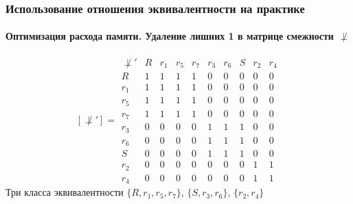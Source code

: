 \begin{frame}
    \frametitle{Использование отношения эквивалентности на практике}
    \framesubtitle{Оптимизация расхода памяти. Удаление лишних 1 в матрице смежности $\not\perp$}
    
    \[
        [\not\perp']=
        \begin{array}{c|ccccccccc}
            \not\perp'
                & R &r_1&r_5&r_7&r_3&r_6& S &r_2&r_4\\\hline
            R   & 1 & 1 & 1 & 1 & 0 & 0 & 0 & 0 & 0\\
            r_1 & 1 & 1 & 1 & 1 & 0 & 0 & 0 & 0 & 0\\
            r_5 & 1 & 1 & 1 & 1 & 0 & 0 & 0 & 0 & 0\\
            r_7 & 1 & 1 & 1 & 1 & 0 & 0 & 0 & 0 & 0\\
            r_3 & 0 & 0 & 0 & 0 & 1 & 1 & 1 & 0 & 0\\
            r_6 & 0 & 0 & 0 & 0 & 1 & 1 & 1 & 0 & 0\\
            S   & 0 & 0 & 0 & 0 & 1 & 1 & 1 & 0 & 0\\
            r_2 & 0 & 0 & 0 & 0 & 0 & 0 & 0 & 1 & 1\\
            r_4 & 0 & 0 & 0 & 0 & 0 & 0 & 0 & 1 & 1
        \end{array}
    \]
    Три класса эквивалентности $\{R,r_1,r_5,r_7\}$, $\{S,r_3,r_6\}$, $\{r_2,r_4\}$
\end{frame}

